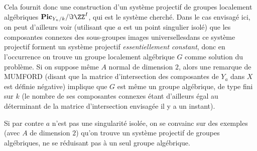 Cela fournit donc une construction d'un syst\`eme projectif de groupes localement alg\'ebriques $\mathbf{Pic}_{Y_n/k}/\Im \ZZ^I$, qui est le syst\`eme cherch\'e. Dans le cas envisag\'e ici, on peut d'ailleurs voir (utilisant que $a$ est un point singulier isol\'e) que les composantes connexes des sous-groupes images universelles\pageoriginale dans ce syst\`eme projectif forment un syst\`eme projectif \emph{essentiellement constant}, donc en l'occurrence on trouve un groupe localement alg\'ebrique $G$ comme solution du probl\`eme. Si on suppose m\^eme $A$ normal de dimension $2$, alors une remarque de MUMFORD (disant que la matrice d'intersection des composantes de $Y_{a}$ dans $X$ est d\'efinie n\'egative) implique que $G$ est m\^eme un groupe alg\'ebrique, \ie de type fini sur $k$ (le nombre de ses composantes connexes \'etant d'ailleurs \'egal au d\'eterminant de la matrice d'intersection envisag\'ee il y a un instant).

Si par contre $a$ n'est pas une singularit\'e isol\'ee, on se convainc sur des exemples (avec $A$ de dimension $2$) qu'on trouve un syst\`eme projectif de groupes alg\'ebriques, ne se r\'eduisant pas \`a un seul groupe alg\'ebrique.

